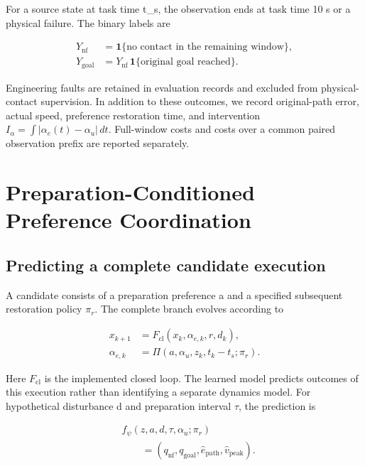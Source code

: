 \documentclass[journal]{IEEEtran}
\begin{document}
For a source state at task time t\_s, the observation ends at task time 10 s or a physical failure. The binary labels are



\begin{equation}\begin{aligned}
Y_{\mathrm{nf}}&=\mathbf{1}\{\text{no contact in the remaining window}\},\\
Y_{\mathrm{goal}}&=Y_{\mathrm{nf}}\,\mathbf{1}\{\text{original goal reached}\}.
\end{aligned}\end{equation}

Engineering faults are retained in evaluation records and excluded from physical-contact supervision. In addition to these outcomes, we record original-path error, actual speed, preference restoration time, and intervention $I_\alpha=\int |\alpha_e(t)-\alpha_u|\,dt$. Full-window costs and costs over a common paired observation prefix are reported separately.


\section{Preparation-Conditioned Preference Coordination}

\subsection{Predicting a complete candidate execution}

A candidate consists of a preparation preference a and a specified subsequent restoration policy $\pi_r$. The complete branch evolves according to



\begin{equation}\begin{aligned}
x_{k+1} &= F_{\mathrm{cl}}(x_k,\alpha_{e,k},r,d_k),\\
\alpha_{e,k} &= \Pi(a,\alpha_u,z_k,t_k-t_s;\pi_r).
\end{aligned}\end{equation}

Here $F_{\mathrm{cl}}$ is the implemented closed loop. The learned model predicts outcomes of this execution rather than identifying a separate dynamics model. For hypothetical disturbance d and preparation interval $\tau$, the prediction is



\begin{equation}\begin{aligned}
&f_\psi(z,a,d,\tau,\alpha_u;\pi_r)\\
&\qquad=(q_{\mathrm{nf}},q_{\mathrm{goal}},\hat e_{\mathrm{path}},\hat v_{\mathrm{peak}}).
\end{aligned}\end{equation}
\end{document}
